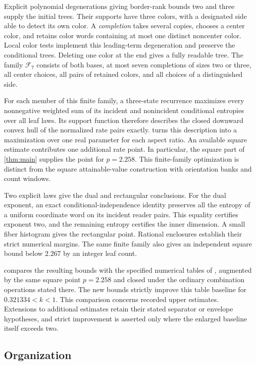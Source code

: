 \documentclass[11pt]{article}
\numberwithin{equation}{section}
\theoremstyle{definition}
\theoremstyle{remark}
\newcommand{\calF}{\mathcal F}
\begin{document}
Explicit polynomial degenerations giving border-rank bounds two and
three supply the initial trees.  Their supports have three colors, with a
designated side able to detect its own color.  A \emph{completion}
takes several copies, chooses a center color, and retains color words
containing at most one distinct noncenter color.  Local color tests
implement this leading-term degeneration and preserve the conditional trees.
Deleting one color at the end gives a fully readable tree.
The family \(\calF_7\) consists of both bases, at most seven
completions of sizes two or three, all center choices, all pairs of
retained colors, and all choices of a distinguished side.

For each member of this finite family, a three-state recurrence
maximizes every nonnegative weighted sum of its incident and
nonincident conditional entropies over all leaf laws.  Its support
function therefore describes the closed downward convex hull of the
normalized rate pairs exactly.   turns
this description into a maximization over one real parameter for
each aspect ratio.  An available square estimate contributes one
additional rate point.  In particular, the square part of
\cref{thm:main} supplies the point for \(p=2.258\).
This finite-family optimization is distinct from the square
attainable-value construction with orientation banks and count windows.

Two explicit laws give the dual and rectangular conclusions.
For the dual exponent, an exact conditional-independence identity
preserves all the entropy of a uniform coordinate word on its incident
reader pairs.  This equality certifies exponent two, and the remaining
entropy certifies the inner dimension.  A small fiber histogram gives
the rectangular point.  Rational enclosures establish their strict
numerical margins.  The same finite family also gives an independent
square bound below \(2.267\) by an integer leaf count.

 compares the resulting bounds with the
specified numerical tables of \cite{vxxz,advxxz}, augmented by the
same square point \(p=2.258\) and closed under the ordinary
combination operations stated there.  The new bounds strictly improve
this table baseline for \(0.321334<k<1\).  This comparison concerns
recorded upper estimates.  Extensions to additional estimates retain
their stated separator or envelope hypotheses, and strict improvement
is asserted only where the enlarged baseline itself exceeds two.

\subsection{Organization}
\end{document}
